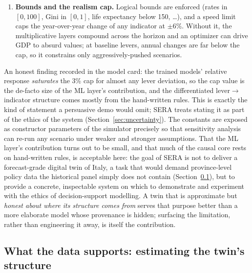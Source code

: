 \documentclass[11pt,a4paper]{article}
\begin{document}
\begin{enumerate}
    target moves with ($+$) or against ($-$) the source, taken from the
    panel-estimated coupling where the data supports it and from documented
    domain knowledge otherwise (Section~\ref{sec:datareview}). This corrects a
    previous sign-\emph{less} implementation that pushed every target in the
    direction of its source's change, mis-signing every opposite-polarity
    link such as income$\to$poverty.
    \item \textbf{Bounds and the realism cap.} Logical bounds are enforced
    (rates in $[0,100]$, Gini in $[0,1]$, life expectancy below 150, \dots),
    and a speed limit caps the year-over-year change of any indicator at
    $\pm6\%$. Without it, the multiplicative layers compound across the horizon
    and an optimizer can drive GDP to absurd values; at baseline levers, annual
    changes are far below the cap, so it constrains only aggressively-pushed
    scenarios.
\end{enumerate}

An honest finding recorded in the model card: the trained models' relative
response \emph{saturates} the 3\% cap for almost any lever deviation, so the cap
value is the de-facto size of the ML layer's contribution, and the
differentiated lever$\to$indicator structure comes mostly from the hand-written
rules. This is exactly the kind of statement a persuasive demo would omit; SERA
treats stating it as part of the ethics of the system
(Section~\ref{sec:uncertainty}). The constants are exposed as constructor
parameters of the simulator precisely so that sensitivity analysis can re-run
any scenario under weaker and stronger assumptions. That the ML layer's
contribution turns out to be small, and that much of the causal core rests on
hand-written rules, is acceptable here: the goal of SERA is not to deliver a
forecast-grade digital twin of Italy, a task that would demand
province-level policy data the historical panel simply does not contain
(Section~\ref{sec:datareview}), but to provide a concrete, inspectable
system on which to demonstrate and experiment with the ethics of decision-support
modelling. A twin that is approximate but \emph{honest about where its structure
comes from} serves that purpose better than a more elaborate model whose
provenance is hidden; surfacing the limitation, rather than engineering it away,
is itself the contribution.


\subsection{What the data supports: estimating the twin's structure}
\label{sec:datareview}
\end{document}
